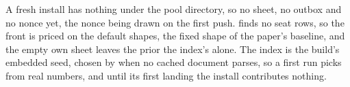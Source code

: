 A fresh install has nothing under the pool directory, so no sheet, no outbox and
no nonce yet, the nonce being drawn on the first push.  finds
no seat rows, so the front is priced on the default shapes, the fixed shape of
the paper's baseline, and the empty own sheet leaves the prior the index's alone.
The index is the build's embedded seed, chosen by  when no
cached document parses, so a first run picks from real numbers, and until its
first landing the install contributes nothing.

